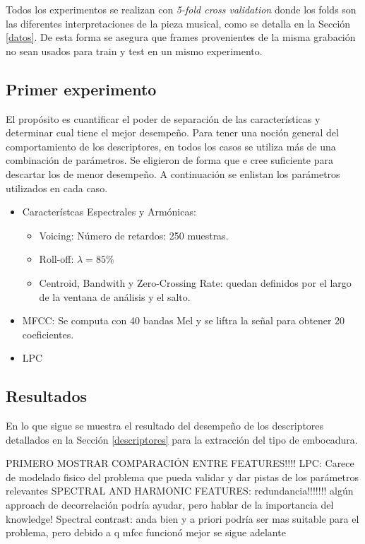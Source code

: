 \documentclass{article}
\begin{document}
Todos los experimentos se realizan con \textit{5-fold cross validation} donde los folds son las diferentes interpretaciones de la pieza musical, como se detalla en la Sección \ref{datos}. De esta forma se asegura que frames provenientes de la misma grabación no sean usados para train y test en un mismo experimento.
\medskip

\subsection{Primer experimento}

El propósito es cuantificar el poder de separación de las características y determinar cual tiene el mejor desempeño. Para tener una noción general del comportamiento de los descriptores, en todos los casos se utiliza más de una combinación de parámetros. Se eligieron de forma que e cree suficiente para descartar los de menor desempeño. A continuación se enlistan los parámetros utilizados en cada caso.

\begin{itemize}
	\item Característcas Espectrales y Armónicas:
	\begin{itemize}
		\item Voicing: Número de retardos: 250 muestras.
		\item Roll-off: $\lambda=85\%$
		\item Centroid, Bandwith y Zero-Crossing Rate: quedan definidos por el largo de la ventana de análisis y el salto.
	\end{itemize}
	\item MFCC: Se computa con 40 bandas Mel y se liftra la señal para obtener 20 coeficientes.
	\item LPC
\end{itemize}

\subsection{Resultados}

En lo que sigue se muestra el resultado del desempeño de los descriptores detallados en la Sección \ref{descriptores} para la extracción del tipo de embocadura.

PRIMERO MOSTRAR COMPARACIÓN ENTRE FEATURES!!!!
LPC: Carece de modelado fisico del problema que pueda validar y dar pistas de los parámetros relevantes
SPECTRAL AND HARMONIC FEATURES: redundancia!!!!!!! algún approach de decorrelación podría ayudar, pero hablar de la importancia del knowledge!
Spectral contrast: anda bien y a priori podría ser mas suitable para el problema, pero debido a q mfcc funcionó mejor se sigue adelante
\end{document}
